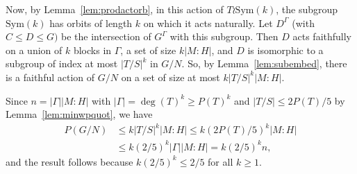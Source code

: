 \documentclass[12pt,a4paper]{article}
\newcommand{\Sym}{\mathrm{Sym}}
\begin{document}
Now, by Lemma~\ref{lem:prodactorb},
in this action of $T \wr \Sym(k)$, the subgroup $\Sym(k)$ has orbits of length
$k$ on which it acts naturally. Let $D^\Gamma$ (with $C \le D \le G)$ be the
intersection of $G^\Gamma$ with this subgroup. Then $D$ acts faithfully
on a union of $k$ blocks in $\Gamma$, a set of size $k|M:H|$, and $D$
is isomorphic to a subgroup of index at most $|T/S|^k$ in $G/N$. 
So, by Lemma~\ref{lem:subembed}, there is a faithful action of $G/N$ on a
set of size at most $k|T/S|^k|M:H|$.

Since $n = |\Gamma||M:H|$ with $|\Gamma| = \deg(T)^k \ge P(T)^k$
and $|T/S| \le 2P(T)/5$ by Lemma~\ref{lem:minwpquot}, we have
\begin{equation*}
\begin{aligned}
P(G/N) & \le k|T/S|^k|M:H|  \le k(2P(T)/5)^k|M:H|\\
&\le  k(2/5)^k|\Gamma||M:H| = k(2/5)^kn,
\end{aligned}
\end{equation*}
and the result follows because $k(2/5)^k \le 2/5$ for all $k \ge 1$.
\end{document}
